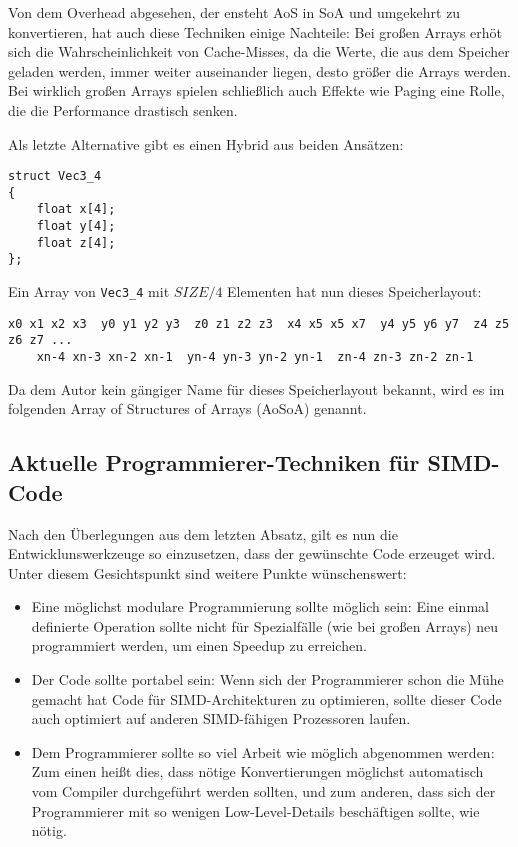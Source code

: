\documentclass[a4paper,10pt]{article}
\begin{document}
Von dem Overhead abgesehen, der ensteht AoS in SoA und umgekehrt zu konvertieren, hat auch diese
Techniken einige Nachteile: Bei großen Arrays erhöt sich die Wahrscheinlichkeit von Cache-Misses, da
die Werte, die aus dem Speicher geladen werden, immer weiter auseinander liegen, desto größer die
Arrays werden. Bei wirklich großen Arrays spielen schließlich auch Effekte wie Paging eine Rolle,
die die Performance drastisch senken.

Als letzte Alternative gibt es einen Hybrid aus beiden Ansätzen:

\begin{verbatim}
struct Vec3_4
{
    float x[4];
    float y[4];
    float z[4];
};
\end{verbatim}

Ein Array von \texttt{Vec3\_4} mit $SIZE/4$ Elementen hat nun dieses Speicherlayout:

\begin{verbatim}
x0 x1 x2 x3  y0 y1 y2 y3  z0 z1 z2 z3  x4 x5 x5 x7  y4 y5 y6 y7  z4 z5 z6 z7 ... 
    xn-4 xn-3 xn-2 xn-1  yn-4 yn-3 yn-2 yn-1  zn-4 zn-3 zn-2 zn-1
\end{verbatim}

Da dem Autor kein gängiger Name für dieses Speicherlayout bekannt, wird es im folgenden Array of
Structures of Arrays (AoSoA) genannt.

\subsection{Aktuelle Programmierer-Techniken für SIMD-Code}

Nach den Überlegungen aus dem letzten Absatz, gilt es nun die Entwicklunswerkzeuge so einzusetzen,
dass der gewünschte Code erzeuget wird. Unter diesem Gesichtspunkt sind weitere Punkte
wünschenswert:

\begin{itemize}
    \item Eine möglichst modulare Programmierung sollte möglich sein: Eine einmal definierte
    Operation sollte nicht für Spezialfälle (wie bei großen Arrays) neu programmiert werden, um
    einen Speedup zu erreichen.

    \item Der Code sollte portabel sein: Wenn sich der Programmierer schon die Mühe gemacht hat Code
    für SIMD-Architekturen zu optimieren, sollte dieser Code auch optimiert auf anderen SIMD-fähigen
    Prozessoren laufen.

    \item Dem Programmierer sollte so viel Arbeit wie möglich abgenommen werden: Zum einen heißt
    dies, dass nötige Konvertierungen möglichst automatisch vom Compiler durchgeführt werden
    sollten, und zum anderen, dass sich der Programmierer mit so wenigen Low-Level-Details
    beschäftigen sollte, wie nötig.

\end{itemize}
\end{document}
